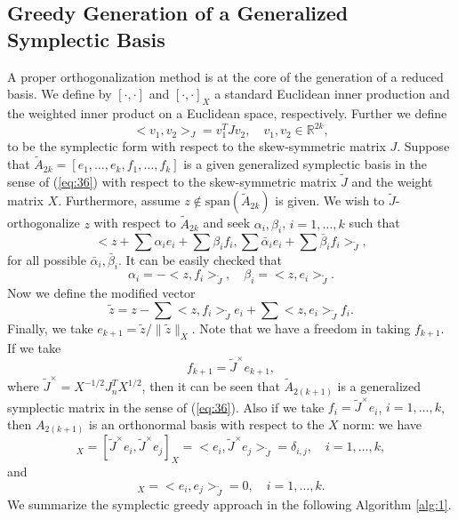 \documentclass[12pt]{article}
\begin{document}
\subsection{Greedy Generation of a Generalized Symplectic Basis}
A proper orthogonalization method is at the core of the generation of a reduced basis. We define by $[\cdot,\cdot]$ and $[\cdot,\cdot]_{X}$ a standard Euclidean inner production and the weighted inner product on a Euclidean space, respectively. Further we define
\begin{equation}
	<v_1,v_2>_{J} = v_1^T J v_2,\quad v_1,v_2 \in \mathbb R^{2k}, 
\end{equation}
to be the symplectic form with respect to the skew-symmetric matrix $J$. Suppose that $\tilde A_{2k}=[e_1,\dots,e_k,f_1,\dots,f_k]$ is a given generalized symplectic basis in the sense of (\ref{eq:36}) with respect to the skew-symmetric matrix $\tilde J$ and the weight matrix $X$. Furthermore, assume $z\not \in \text{span} (\tilde A_{2k})$ is given. We wish to $\tilde J$-orthogonalize $z$ with respect to $\tilde A_{2k}$ and seek $\alpha_i,\beta_i$, $i=1,\dots,k$ such that
\begin{equation}
	< z + \sum \alpha_i e_i + \sum \beta_i f_i , \sum \bar \alpha_i e_i + \sum \bar \beta_i f_i >_{\tilde J},
\end{equation}
for all possible $\bar \alpha_i , \bar \beta_i$. It can be easily checked that
\begin{equation}
	\alpha_i = -<z,f_i>_{\tilde J}, \quad \beta_i = <z,e_i>_{\tilde J}.
\end{equation}
Now we define the modified vector
\begin{equation}
	\tilde z = z - \sum <z,f_i>_{\tilde J} e_i + \sum <z,e_i>_{\tilde J} f_i.
\end{equation}
Finally, we take $e_{k+1} = \tilde z / \| \tilde z \|_X$. Note that we have a freedom in taking $f_{k+1}$. If we take
\begin{equation}
	f_{k+1} = \tilde J ^{\times} e_{k+1},
\end{equation}
where $\tilde J ^{\times} = X^{-1/2} J_{n}^T X^{1/2}$, then it can be seen that $\tilde A_{2(k+1)}$ is a generalized symplectic matrix in the sense of (\ref{eq:36}). Also if we take $f_i = \tilde J ^{\times} e_i$, $i=1,\dots,k$, then $A_{2(k+1)}$ is an orthonormal basis with respect to the $X$ norm: we have
\begin{equation}
		[e_i,e_j]_X = [\tilde J ^{\times}e_i,\tilde J ^{\times}e_j]_X = <e_i,\tilde J ^{\times} e_j>_{\tilde J} = \delta_{i,j}, \quad i=1,\dots,k,
\end{equation}
and
\begin{equation}	
		[e_i,\tilde J ^{\times} e_i]_X = <e_i,e_j>_{\tilde J} = 0, \quad i=1,\dots,k.
\end{equation}
We summarize the symplectic greedy approach in the following Algorithm \ref{alg:1}.
\end{document}

